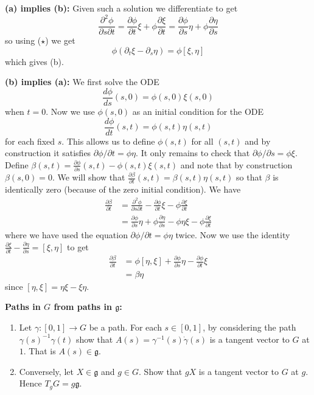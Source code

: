 \documentclass[12pt]{article}
\begin{document}
\begin{answer}
{\bf (a) implies (b):} Given such a solution we differentiate to get
\[\frac{\partial^2\phi}{\partial s\partial t}=\frac{\partial\phi}{\partial t}\xi+\phi\frac{\partial\xi}{\partial t}=\frac{\partial\phi}{\partial s}\eta+\phi\frac{\partial\eta}{\partial s}\]
so using ($\star$) we get
\[\phi(\partial_t\xi-\partial_s\eta)=\phi[\xi,\eta]\]
which gives (b).

{\bf (b) implies (a):} We first solve the ODE
\[\frac{d\phi}{ds}(s,0)=\phi(s,0)\xi(s,0)\]
when $t=0$. Now we use $\phi(s,0)$ as an initial condition for the ODE
\[\frac{d\phi}{dt}(s,t)=\phi(s,t)\eta(s,t)\]
for each fixed $s$. This allows us to define $\phi(s,t)$ for all $(s,t)$ and by construction it satisfies $\partial\phi/\partial t=\phi\eta$. It only remains to check that $\partial\phi/\partial s=\phi\xi$. Define $\beta(s,t)=\frac{\partial\phi}{\partial s}(s,t)-\phi(s,t)\xi(s,t)$ and note that by construction $\beta(s,0)=0$. We will show that $\frac{\partial\beta}{\partial t}(s,t)=\beta(s,t)\eta(s,t)$ so that $\beta$ is identically zero (because of the zero initial condition). We have
\begin{align*}
\frac{\partial\beta}{\partial t}&=\frac{\partial^2\phi}{\partial s\partial t}-\frac{\partial\phi}{\partial t}\xi-\phi\frac{\partial\xi}{\partial t}\\
&=\frac{\partial\phi}{\partial s}\eta+\phi\frac{\partial\eta}{\partial s}-\phi\eta\xi-\phi\frac{\partial\xi}{\partial t}
\end{align*}
where we have used the equation $\partial\phi/\partial t=\phi\eta$ twice. Now we use the identity $\frac{\partial\xi}{\partial t}-\frac{\partial\eta}{\partial s}=[\xi,\eta]$ to get
\begin{align*}\frac{\partial\beta}{\partial t}&=\phi[\eta,\xi]+\frac{\partial\phi}{\partial s}\eta-\frac{\partial\phi}{\partial t}\xi\\
&=\beta\eta\end{align*}
since $[\eta,\xi]=\eta\xi-\xi\eta$.
\end{answer}


{\bf Paths in $G$ from paths in $\mathfrak{g}$:}

\begin{question}
\begin{enumerate}
\item[(a)]  Let $\gamma\colon[0,1]\to G$ be a path. For each $s\in[0,1]$, by considering the path $\gamma(s)^{-1}\gamma(t)$ show that $A(s)=\gamma^{-1}(s)\dot{\gamma}(s)$ is a tangent vector to $G$ at $1$. That is $A(s)\in\mathfrak{g}$.

\item[(b)] Conversely, let $X\in\mathfrak{g}$ and $g\in G$. Show that $gX$ is a tangent vector to $G$ at $g$. Hence $T_gG=g\mathfrak{g}$.
\end{enumerate}
\end{question}
\end{document}
